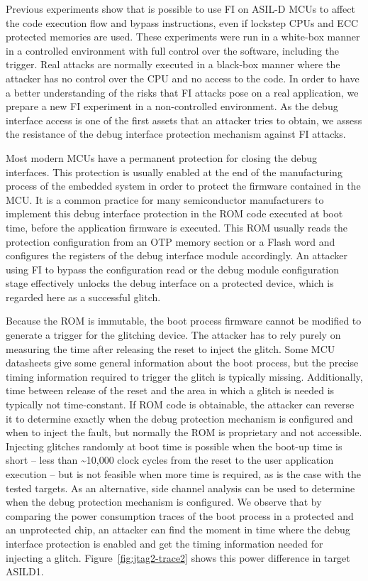 \documentclass[a4paper, 10pt]{article}
\newcommand{\TI}{ASILD1\xspace}
\begin{document}
Previous experiments show that is possible to use FI on ASIL-D MCUs to affect the code execution flow and bypass instructions, even if lockstep CPUs and ECC protected memories are used. These experiments were run in a white-box manner in a controlled environment with full control over the software, including the trigger. Real attacks are normally executed in a black-box manner where the attacker has no control over the CPU and no access to the code. In order to have a better understanding of the risks that FI attacks pose on a real application, we prepare a new FI experiment in a non-controlled environment. As the debug interface access is one of the first assets that an attacker tries to obtain, we assess the resistance of the debug interface protection mechanism against FI attacks.

Most modern MCUs have a permanent protection for closing the debug interfaces. This protection is usually enabled at the end of the manufacturing process of the embedded system in order to protect the firmware contained in the MCU. It is a common practice for many semiconductor manufacturers to implement this debug interface protection in the ROM code executed at boot time, before the application firmware is executed. This ROM usually reads the protection configuration from an OTP memory section or a Flash word and configures the registers of the debug interface module accordingly. An attacker using FI to bypass the configuration read or the debug module configuration stage effectively unlocks the debug interface on a protected device, which is regarded here as a successful glitch. 

Because the ROM is immutable, the boot process firmware cannot be modified to generate a trigger for the glitching device. The attacker has to rely purely on measuring the time after releasing the reset to inject the glitch. Some MCU datasheets give some general information about the boot process, but the precise timing information required to trigger the glitch is typically missing. Additionally, time between release of the reset and the area in which a glitch is needed is typically not time-constant. If ROM code is obtainable, the attacker can reverse it to determine exactly when the debug protection mechanism is configured and when to inject the fault, but normally the ROM is proprietary and not accessible. Injecting glitches randomly at boot time is possible when the boot-up time is short -- less than \textasciitilde10,000 clock cycles from the reset to the user application execution -- but is not feasible when more time is required, as is the case with the tested targets. As an alternative, side channel analysis can be used to determine when the debug protection mechanism is configured. We observe that by comparing the power consumption traces of the boot process in a protected and an unprotected chip, an attacker can find the moment in time where the debug interface protection is enabled and get the timing information needed for injecting a glitch. Figure~\ref{fig:jtag2-trace2} shows this power difference in target \TI.
\end{document}
